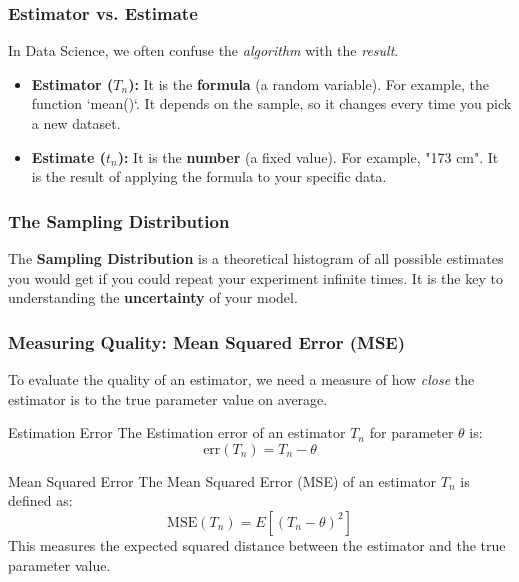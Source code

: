 \documentclass[11pt]{article}
\theoremstyle{smallexample}
\begin{document}
\subsubsection{Estimator vs. Estimate}
In Data Science, we often confuse the \textit{algorithm} with the \textit{result}.
\begin{itemize}
    \item \textbf{Estimator ($T_n$):} It is the \textbf{formula} (a random variable). For example, the function `mean()`. It depends on the sample, so it changes every time you pick a new dataset.
    \item \textbf{Estimate ($t_n$):} It is the \textbf{number} (a fixed value). For example, "173 cm". It is the result of applying the formula to your specific data.
\end{itemize}

\subsubsection{The Sampling Distribution}
The \textbf{Sampling Distribution} is a theoretical histogram of all possible estimates you would get if you could repeat your experiment infinite times. It is the key to understanding the \textbf{uncertainty} of your model.

\subsubsection{Measuring Quality: Mean Squared Error (MSE)}


To evaluate the quality of an estimator, we need a measure of how \textit{close} the estimator is to the true parameter value on average.

\begin{defbox}{Estimation Error}
The Estimation error of an estimator $T_n$ for parameter $\theta$ is:
\begin{equation}
\text{err}(T_n) = T_n - \theta
\end{equation}
\end{defbox}

\begin{defbox}{Mean Squared Error}
The Mean Squared Error (MSE) of an estimator $T_n$ is defined as:
\begin{equation}
\text{MSE}(T_n) = E\left[(T_n - \theta)^2\right]
\end{equation}
This measures the expected squared distance between the estimator and the true parameter value.
\end{defbox}
\end{document}

